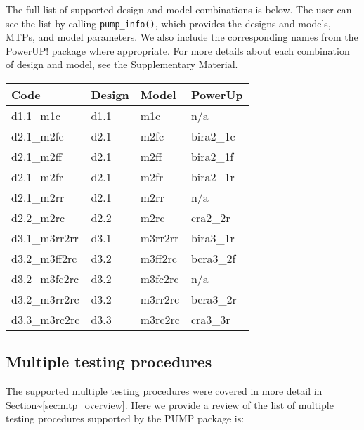 \documentclass[
]{article}
\begin{document}
The full list of supported design and model combinations is below. The
user can see the list by calling \texttt{pump\_info()}, which provides
the designs and models, MTPs, and model parameters. We also include the
corresponding names from the PowerUP! package where appropriate. For
more details about each combination of design and model, see the
Supplementary Material.

\begin{tabular}{l|l|l|l}
\hline
Code & Design & Model & PowerUp\\
\hline
d1.1\_m1c & d1.1 & m1c & n/a\\
\hline
d2.1\_m2fc & d2.1 & m2fc & bira2\_1c\\
\hline
d2.1\_m2ff & d2.1 & m2ff & bira2\_1f\\
\hline
d2.1\_m2fr & d2.1 & m2fr & bira2\_1r\\
\hline
d2.1\_m2rr & d2.1 & m2rr & n/a\\
\hline
d2.2\_m2rc & d2.2 & m2rc & cra2\_2r\\
\hline
d3.1\_m3rr2rr & d3.1 & m3rr2rr & bira3\_1r\\
\hline
d3.2\_m3ff2rc & d3.2 & m3ff2rc & bcra3\_2f\\
\hline
d3.2\_m3fc2rc & d3.2 & m3fc2rc & n/a\\
\hline
d3.2\_m3rr2rc & d3.2 & m3rr2rc & bcra3\_2r\\
\hline
d3.3\_m3rc2rc & d3.3 & m3rc2rc & cra3\_3r\\
\hline
\end{tabular}

\subsection{Multiple testing procedures}

The supported multiple testing procedures were covered in more detail in
Section\textasciitilde{}\ref{sec:mtp_overview}. Here we provide a review
of the list of multiple testing procedures supported by the PUMP package
is:
\end{document}
